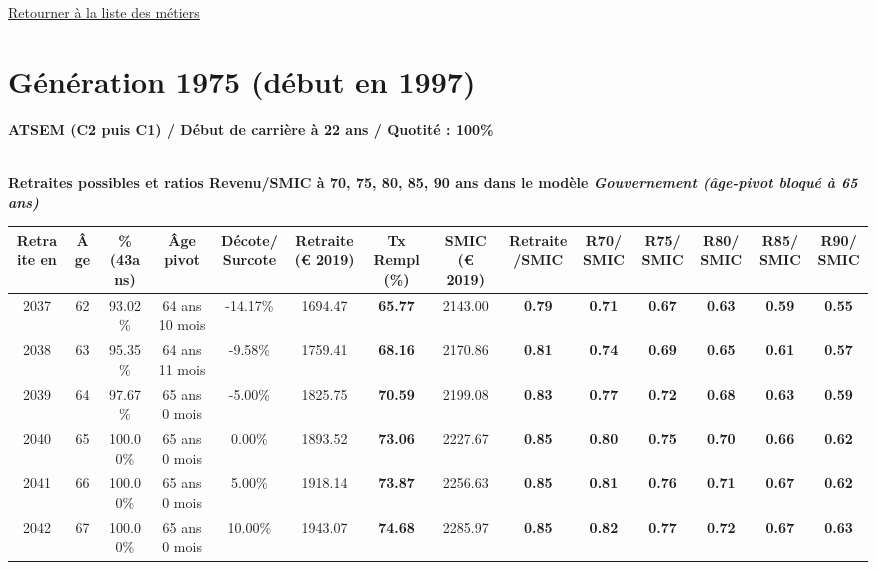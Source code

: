  \hyperlink{page.2}{\noindent Retourner à la liste des métiers}

 \newpage 

\section{Génération 1975 (début en 1997)\label{ATSEM_100_1975_22_0}} 
 
{\bf \noindent ATSEM (C2 puis C1) / Début de carrière à 22 ans / Quotité : 100\%}  ~ 

 ~\\{\bf \noindent Retraites possibles et ratios Revenu/SMIC à 70, 75, 80, 85, 90 ans dans le modèle \emph{Gouvernement (âge-pivot bloqué à 65 ans)}}  
 
\begin{adjustbox}{max width=\textwidth} 
\begin{tabular}[htb]{|c|c||c|c|c||c|c||c|c||c|c|c|c|c|} 
\hline 
 Retraite en &  Âge &  \%(43ans) &  Âge pivot &  Décote/Surcote &  Retraite (\euro{} 2019) &  Tx Rempl(\%) &  SMIC (\euro{} 2019) &  Retraite/SMIC &  R70/SMIC &  R75/SMIC &  R80/SMIC &  R85/SMIC &  R90/SMIC \\ 
\hline \hline 
 2037 &  62 &  93.02\% &  64 ans 10 mois &  -14.17\% &  1694.47 &  {\bf 65.77} &  2143.00 &  {\bf {\color{red} 0.79}} &  {\bf {\color{red} 0.71}} &  {\bf {\color{red} 0.67}} &  {\bf {\color{red} 0.63}} &  {\bf {\color{red} 0.59}} &  {\bf {\color{red} 0.55}} \\ 
\hline 
 2038 &  63 &  95.35\% &  64 ans 11 mois &  -9.58\% &  1759.41 &  {\bf 68.16} &  2170.86 &  {\bf {\color{red} 0.81}} &  {\bf {\color{red} 0.74}} &  {\bf {\color{red} 0.69}} &  {\bf {\color{red} 0.65}} &  {\bf {\color{red} 0.61}} &  {\bf {\color{red} 0.57}} \\ 
\hline 
 2039 &  64 &  97.67\% &  65 ans 0 mois &  -5.00\% &  1825.75 &  {\bf 70.59} &  2199.08 &  {\bf {\color{red} 0.83}} &  {\bf {\color{red} 0.77}} &  {\bf {\color{red} 0.72}} &  {\bf {\color{red} 0.68}} &  {\bf {\color{red} 0.63}} &  {\bf {\color{red} 0.59}} \\ 
\hline 
 2040 &  65 &  100.00\% &  65 ans 0 mois &  0.00\% &  1893.52 &  {\bf 73.06} &  2227.67 &  {\bf {\color{red} 0.85}} &  {\bf {\color{red} 0.80}} &  {\bf {\color{red} 0.75}} &  {\bf {\color{red} 0.70}} &  {\bf {\color{red} 0.66}} &  {\bf {\color{red} 0.62}} \\ 
\hline 
 2041 &  66 &  100.00\% &  65 ans 0 mois &  5.00\% &  1918.14 &  {\bf 73.87} &  2256.63 &  {\bf {\color{red} 0.85}} &  {\bf {\color{red} 0.81}} &  {\bf {\color{red} 0.76}} &  {\bf {\color{red} 0.71}} &  {\bf {\color{red} 0.67}} &  {\bf {\color{red} 0.62}} \\ 
\hline 
 2042 &  67 &  100.00\% &  65 ans 0 mois &  10.00\% &  1943.07 &  {\bf 74.68} &  2285.97 &  {\bf {\color{red} 0.85}} &  {\bf {\color{red} 0.82}} &  {\bf {\color{red} 0.77}} &  {\bf {\color{red} 0.72}} &  {\bf {\color{red} 0.67}} &  {\bf {\color{red} 0.63}} \\ 
\hline 
\hline 
\end{tabular} 
\end{adjustbox} 
 
